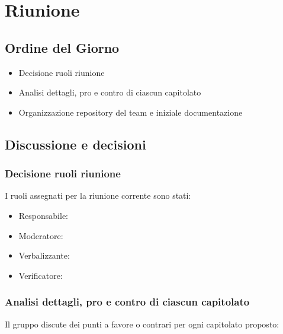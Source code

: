 \section{Riunione}
\subsection{Ordine del Giorno}
\begin{itemize}
	\item Decisione ruoli riunione
	\item Analisi dettagli, pro e contro di ciascun capitolato
	\item Organizzazione repository del team e iniziale documentazione
\end{itemize}

\subsection{Discussione e decisioni}

\subsubsection{Decisione ruoli riunione}
I ruoli assegnati per la riunione corrente sono stati:
\begin{itemize}
	\item Responsabile: \sebastiano
	\item Moderatore: \tommaso
	\item Verbalizzante: \raul
	\item Verificatore: \martina
\end{itemize}

\subsubsection{Analisi dettagli, pro e contro di ciascun capitolato}
Il gruppo discute dei punti a favore o contrari per ogni capitolato proposto:

